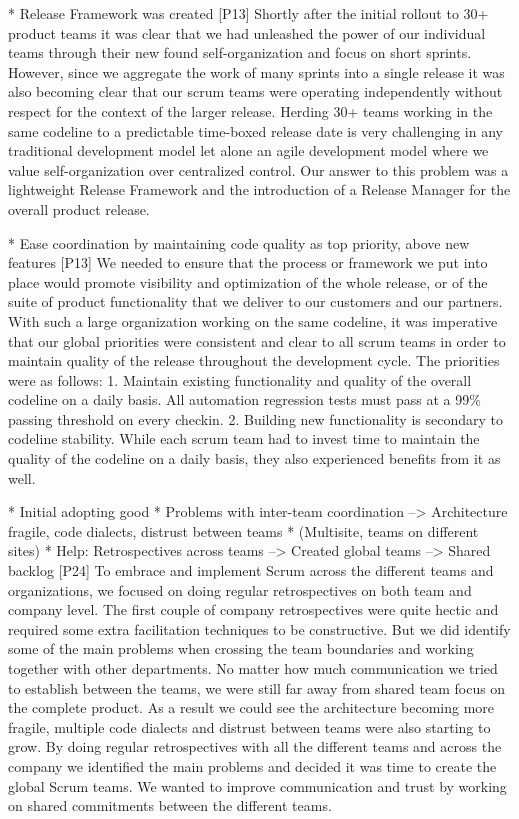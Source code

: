 \documentclass[preprint,authoryear,12pt]{elsarticle}
\begin{document}
* Release Framework was created
[P13]
Shortly after the initial rollout to 30+ product teams it was clear that we had
unleashed the power of our individual teams through their new found
self-organization and focus on short sprints.  However, since we aggregate the
work of many sprints into a single release it was also becoming clear that our
scrum teams were operating independently without respect for the context of the
larger release.  Herding 30+ teams working in the same codeline to a predictable
time-boxed release date is very challenging in any traditional development model
let alone an agile development model where we value self-organization over
centralized control.
Our answer to this problem was a lightweight Release Framework and the
introduction of a Release Manager for the overall product release.

* Ease coordination by maintaining code quality as top priority, above new features
[P13]
We needed to ensure that the process or framework we put into place would
promote visibility and optimization of the whole release, or of the suite of
product functionality that we deliver to our customers and our partners.
With such a large organization working on the same codeline, it was imperative
that our global priorities were consistent and clear to all scrum teams in order
to maintain quality of the release throughout the development cycle.  The
priorities were as follows:
1. Maintain existing functionality and quality of the overall codeline on a
daily basis.  All automation regression tests must pass at a 99\% passing
threshold on every checkin.
2. Building new functionality is secondary to codeline stability.
While each scrum team had to invest time to maintain the quality of the codeline
on a daily basis, they also experienced benefits from it as well.


* Initial adopting good
* Problems with inter-team coordination --> Architecture fragile, code dialects, distrust between teams
* (Multisite, teams on different sites)
* Help: Retrospectives across teams --> Created global teams --> Shared backlog
[P24]
To embrace and implement Scrum across the different teams and organizations, we
focused on doing regular retrospectives on both team and company level.
The first couple of company retrospectives were quite hectic and required some
extra facilitation techniques to be constructive. But we did identify some of
the main problems when crossing the team boundaries and working together with
other departments.
No matter how much communication we tried to establish between the teams, we
were still far away from shared team focus on the complete product. As a result
we could see the architecture becoming more fragile, multiple code dialects and
distrust between teams were also starting to grow.
By doing regular retrospectives with all the different teams and across the
company we identified the main problems and decided it was time to create the
global Scrum teams. We wanted to improve communication and trust by working on
shared commitments between the different teams.
\end{document}
